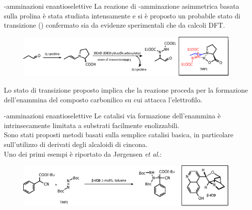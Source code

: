 \documentclass[10pt]{beamer}
\begin{document}
\begin{frame}[fragile]{{\textalpha}-amminazioni enantioselettive}
La reazione di {\textalpha}-amminazione asimmetrica basata sulla prolina è stata studiata intensamente e si è proposto un probabile \alert{stato di transizione} () confermato sia da evidenze sperimentali che da calcoli DFT.
\begin{figure}[H] 
	\centering
	\includegraphics[scale=0.7]{P_mfzt.eps}
\end{figure}  
Lo stato di transizione proposto implica che la reazione proceda per la formazione dell'\alert{enammina del composto carbonilico} su cui attacca l'elettrofilo.
\end{frame}

\begin{frame}[fragile]{{\textalpha}-amminazioni enantioselettive}
Le catalisi via formazione dell'enammina è intrinsecamente \alert{limitata a substrati facilmente enolizzabili}.\\
Sono stati proposti metodi basati sulla semplice \alert{catalisi basica}, in particolare sull'utilizzo di \alert{derivati degli alcaloidi di cincona}.\\
Uno dei primi esempi è riportato da J\o rgensen \textit{et al.}:
\begin{figure}[H] 
	\centering
	\includegraphics[scale=0.7]{P_firstcinchona.eps}
\end{figure}  

\end{frame}
\end{document}

